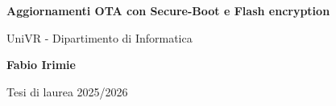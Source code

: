 \begin{titlepage}
	\begin{center}
		\vspace*{1cm}

		\Huge
		\textbf{Aggiornamenti OTA con Secure-Boot e Flash encryption}

		\vspace{0.5cm}
		\LARGE
		UniVR - Dipartimento di Informatica

		\vspace{1.5cm}

		\textbf{Fabio Irimie}

		\vfill


		\vspace{0.8cm}


		Tesi di laurea 2025/2026

	\end{center}
\end{titlepage}
